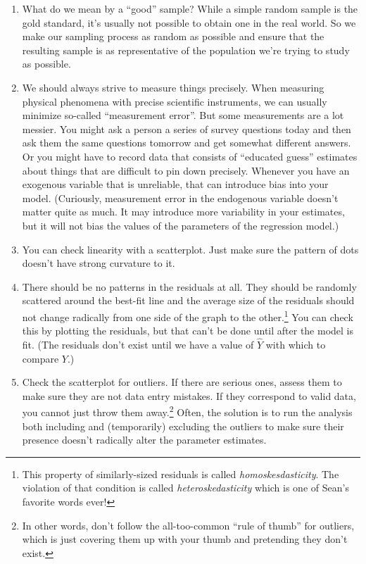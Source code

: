 \documentclass[
]{book}
\providecommand{\tightlist}{%
  \setlength{\itemsep}{0pt}\setlength{\parskip}{0pt}}
\begin{document}
\begin{enumerate}
\def\labelenumi{\arabic{enumi}.}
\tightlist
\item
  What do we mean by a ``good'' sample? While a simple random sample is the gold standard, it's usually not possible to obtain one in the real world. So we make our sampling process as random as possible and ensure that the resulting sample is as representative of the population we're trying to study as possible.
\item
  We should always strive to measure things precisely. When measuring physical phenomena with precise scientific instruments, we can usually minimize so-called ``measurement error''. But some measurements are a lot messier. You might ask a person a series of survey questions today and then ask them the same questions tomorrow and get somewhat different answers. Or you might have to record data that consists of ``educated guess'' estimates about things that are difficult to pin down precisely. Whenever you have an exogenous variable that is unreliable, that can introduce bias into your model. (Curiously, measurement error in the endogenous variable doesn't matter quite as much. It may introduce more variability in your estimates, but it will not bias the values of the parameters of the regression model.)
\item
  You can check linearity with a scatterplot. Just make sure the pattern of dots doesn't have strong curvature to it.
\item
  There should be no patterns in the residuals at all. They should be randomly scattered around the best-fit line and the average size of the residuals should not change radically from one side of the graph to the other.\footnote{This property of similarly-sized residuals is called \emph{homoskesdasticity}. The violation of that condition is called \emph{heteroskedasticity} which is one of Sean's favorite words ever!} You can check this by plotting the residuals, but that can't be done until after the model is fit. (The residuals don't exist until we have a value of \(\hat{Y}\) with which to compare \(Y\).)
\item
  Check the scatterplot for outliers. If there are serious ones, assess them to make sure they are not data entry mistakes. If they correspond to valid data, you cannot just throw them away.\footnote{In other words, don't follow the all-too-common ``rule of thumb'' for outliers, which is just covering them up with your thumb and pretending they don't exist.} Often, the solution is to run the analysis both including and (temporarily) excluding the outliers to make sure their presence doesn't radically alter the parameter estimates.
\end{enumerate}
\end{document}
